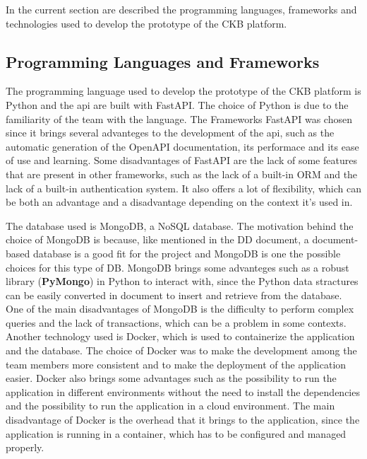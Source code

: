 In the current section are described the programming languages, frameworks and technologies used to develop the prototype of the CKB platform.

\subsection{Programming Languages and Frameworks}
The programming language used to develop the prototype of the CKB platform is Python and the api are built with FastAPI.
The choice of Python is due to the familiarity of the team with the language. The Frameworks FastAPI was chosen since it brings several advanteges to the development of the api, such as the automatic generation of the OpenAPI documentation, its performace and its ease of use and learning. Some disadvantages of FastAPI are the lack of some features that are present in other frameworks, such as the lack of a built-in ORM and the lack of a built-in authentication system. It also offers a lot of flexibility, which can be both an advantage and a disadvantage depending on the context it's used in.

The database used is MongoDB, a NoSQL database. The motivation behind the choice of MongoDB is because, like mentioned in the DD document, a document-based database is a good fit for the project and MongoDB is one the possible choices for this type of DB. MongoDB brings some advanteges such as a robust library (\textbf{PyMongo}) in Python to interact with, since the Python data stractures can be easily converted in document to insert and retrieve from the database. One of the main disadvantages of MongoDB is the difficulty to perform complex queries and the lack of transactions, which can be a problem in some contexts.
Another technology used is Docker, which is used to containerize the application and the database. The choice of Docker was to make the development among the team members more consistent and to make the deployment of the application easier. Docker also brings some advantages such as the possibility to run the application in different environments without the need to install the dependencies and the possibility to run the application in a cloud environment. The main disadvantage of Docker is the overhead that it brings to the application, since the application is running in a container, which has to be configured and managed properly.

